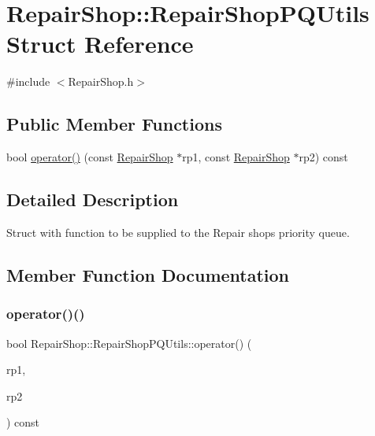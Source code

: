 \hypertarget{structRepairShop_1_1RepairShopPQUtils}{}\section{Repair\+Shop\+:\+:Repair\+Shop\+P\+Q\+Utils Struct Reference}
\label{structRepairShop_1_1RepairShopPQUtils}


{\ttfamily \#include $<$Repair\+Shop.\+h$>$}

\subsection*{Public Member Functions}
\begin{DoxyCompactItemize}
\item 
bool \mbox{\hyperlink{structRepairShop_1_1RepairShopPQUtils_ae278a2688d21efbd9ff519a72f8382e3}{operator()}} (const \mbox{\hyperlink{classRepairShop}{Repair\+Shop}} $\ast$rp1, const \mbox{\hyperlink{classRepairShop}{Repair\+Shop}} $\ast$rp2) const
\end{DoxyCompactItemize}


\subsection{Detailed Description}
Struct with function to be supplied to the Repair shops priority queue. 

\subsection{Member Function Documentation}
\mbox{\label{structRepairShop_1_1RepairShopPQUtils_ae278a2688d21efbd9ff519a72f8382e3}} 
\subsubsection{\texorpdfstring{operator()()}{operator()()}}
{\footnotesize\ttfamily bool Repair\+Shop\+::\+Repair\+Shop\+P\+Q\+Utils\+::operator() (\begin{DoxyParamCaption}\item[{const \mbox{\hyperlink{classRepairShop}{Repair\+Shop}} $\ast$}]{rp1,  }\item[{const \mbox{\hyperlink{classRepairShop}{Repair\+Shop}} $\ast$}]{rp2 }\end{DoxyParamCaption}) const\hspace{0.3cm}{\ttfamily [inline]}}

